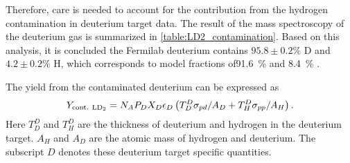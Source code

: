 \documentclass[../main.tex]{subfiles}
\begin{document}
Therefore, care is needed to account for the contribution from the hydrogen contamination in deuterium
target data. The result of the mass spectroscopy of the deuterium gas \cite{paul-1893} is
summarized in \cref{table:LD2_contamination}. Based on this analysis, it is concluded the Fermilab
deuterium contains $95.8\pm0.2\%$ D and $4.2\pm0.2\%$ H,
which corresponds to model fractions of\SI{91.6}{\percent}  and \SI{8.4}{\percent} .

The yield from the contaminated deuterium can be expressed as
\begin{equation}
	Y_{\mathrm{cont.~\ce{LD_2}}} = N_A P_D X_D \epsilon_D \left( T_D^D \sigma_{pd}/A_D + T^D_H \sigma_{pp}/A_H   \right).
\end{equation}
Here $T_D^D$ and $T^D_H$ are the thickness of deuterium and hydrogen in the deuterium target.
$A_H$ and $A_D$ are the atomic mass of hydrogen and deuterium.
The subscript $D$ denotes these deuterium target specific quantities.
\end{document}
